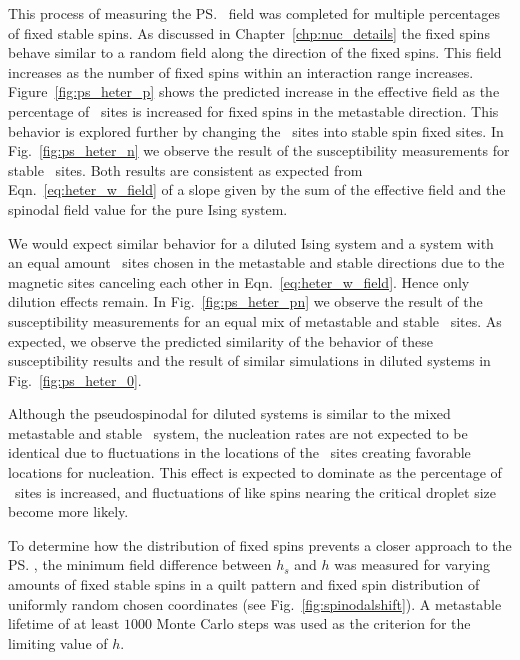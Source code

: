 This process of measuring the \ps\ field was completed for multiple percentages of fixed stable spins. As discussed in Chapter~\ref{chp:nuc_details} the fixed spins behave similar to a random field along the direction of the fixed spins. This field increases as the number of fixed spins within an interaction range increases. Figure~\ref{fig:ps_heter_p} shows the predicted increase in the effective field as the percentage of \het\ sites is increased for fixed spins in the metastable direction. This behavior is explored further by changing the \het\ sites into stable spin fixed sites. In Fig.~\ref{fig:ps_heter_n} we observe the result of the susceptibility measurements for stable \het\ sites. Both results are consistent as expected from Eqn.~\eqref{eq:heter_w_field} of a slope given by the sum of the effective field and the spinodal field value for the pure Ising system. 

We would expect similar behavior for a diluted Ising system and a system with an equal amount \het\ sites chosen in the metastable and stable directions due to the  magnetic sites canceling each other in Eqn.~\eqref{eq:heter_w_field}. Hence only dilution effects remain. In Fig.~\ref{fig:ps_heter_pn} we observe the result of the susceptibility measurements for an equal mix of metastable and stable \het\ sites. As expected, we observe the predicted similarity of the behavior of these susceptibility results and the result of similar simulations in diluted systems in Fig.~\ref{fig:ps_heter_0}.    %


Although the pseudospinodal for diluted systems is similar to the mixed metastable and stable \het\ system, the nucleation rates are not expected to be identical due to  fluctuations in the locations of the \het\ sites creating favorable locations for nucleation. This effect is expected to dominate as the percentage of \het\ sites is increased, and fluctuations of like spins nearing the critical droplet size become more likely.


To determine how the distribution of fixed spins  prevents a closer approach to the \ps, the minimum field difference between $h_s$  and $h$ was measured for varying amounts of fixed stable spins in a quilt pattern and fixed spin distribution of uniformly random chosen coordinates (see Fig.~\ref{fig:spinodalshift}). A metastable lifetime of at least $1000$ Monte Carlo steps was used as the criterion for the limiting value of $h$. 

